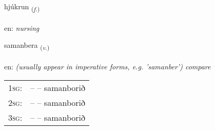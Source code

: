 \documentclass[frontgrid, backgrid]{flacards}\usepackage[]{graphicx}\usepackage[]{xcolor}
\begin{document}
\renewcommand{\flhead}{\vskip5pt \fboxsep=0pt {\small\bfseries\footnotesize Nafnorð | Noun}}
\renewcommand{\fcfoot}{\vskip5pt \fboxsep=0pt \hspace{2pt}{\small\bfseries\footnotesize 3K}}

\renewcommand{\blhead}{\vskip5pt {\small\bfseries\footnotesize Nafnorð | Noun }}
\renewcommand{\bcfoot}{\vskip5pt \hspace{2pt}{\small\bfseries\footnotesize 3K}}


{hjúkrun \small{\textsubscript{(\textit{f.})}} \\[1ex] %
\textphonetic{[çuːkrʏn]} \\
en: \emph{nursing} \\  [2ex]
\renewcommand*{\arraystretch}{0.8}
}

\renewcommand{\flhead}{\vskip5pt \fboxsep=0pt {\small\bfseries\footnotesize Sagnorð | Verb}}
\renewcommand{\fcfoot}{\vskip5pt \fboxsep=0pt \hspace{2pt}{\small\bfseries\footnotesize 3K}}

\renewcommand{\blhead}{\vskip5pt {\small\bfseries\footnotesize Sagnorð | Verb }}
\renewcommand{\bcfoot}{\vskip5pt \hspace{2pt}{\small\bfseries\footnotesize 3K}}


{samanbera \small{\textsubscript{(\textit{v.})}} \\[1ex] %
\textphonetic{[saːmanpɛra]} \\
en: \emph{(usually appear in imperative forms, e.g. 'samanber') compare} \\  [2ex]
\renewcommand*{\arraystretch}{0.8}
\begin{tabular}{p{1cm}l}
\textsc{1sg}: &  --  -- samanborið \\ 
\textsc{2sg}: &  --  -- samanborið \\ 
\textsc{3sg}: &  --  -- samanborið \\ 
\end{tabular}
}
\end{document}

